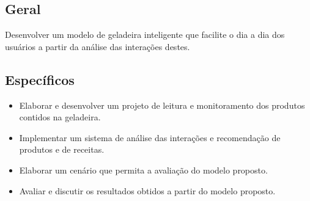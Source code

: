 \subsection{Geral}



Desenvolver um modelo de geladeira inteligente que facilite o dia a dia dos usuários a partir da análise das interações destes.
    

\subsection{Específicos}


\begin{itemize}[noitemsep,topsep=5pt]%
	\item Elaborar e desenvolver um projeto de leitura e monitoramento dos produtos contidos na geladeira.
	\item Implementar um sistema de análise das interações e recomendação de produtos e de receitas.
	\item Elaborar um cenário que permita a avaliação do modelo proposto.
	\item Avaliar e discutir os resultados obtidos a partir do modelo proposto.


\end{itemize}


